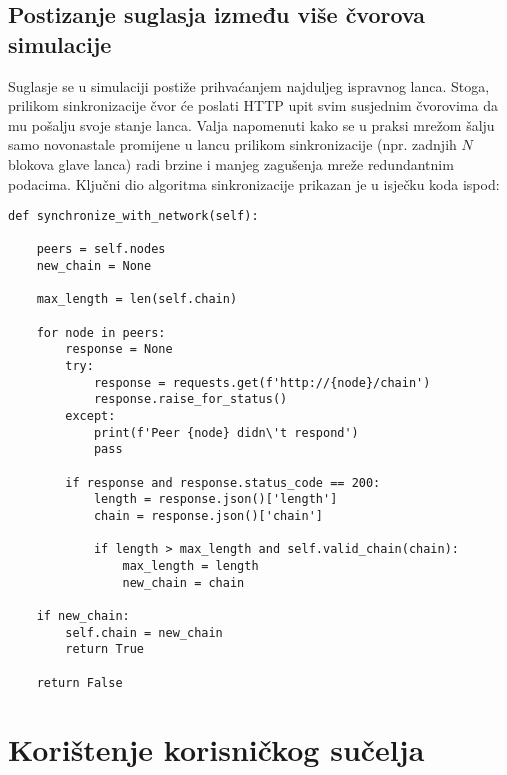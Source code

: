 \documentclass[utf8, zavrsni]{fer}
\begin{document}
\section{Postizanje suglasja između više čvorova simulacije}
Suglasje se u simulaciji postiže prihvaćanjem najduljeg ispravnog lanca. Stoga, prilikom sinkronizacije čvor će poslati HTTP upit svim susjednim čvorovima da mu pošalju svoje stanje lanca. Valja napomenuti kako se u praksi mrežom šalju samo novonastale promijene u lancu prilikom sinkronizacije (npr. zadnjih $ N $ blokova glave lanca) radi brzine i manjeg zagušenja mreže redundantnim podacima. Ključni dio algoritma sinkronizacije prikazan je u isječku koda ispod:

\begin{verbatim}
def synchronize_with_network(self):

    peers = self.nodes
    new_chain = None

    max_length = len(self.chain)

    for node in peers:
        response = None
        try:
            response = requests.get(f'http://{node}/chain')
            response.raise_for_status()
        except:
            print(f'Peer {node} didn\'t respond')
            pass

        if response and response.status_code == 200:
            length = response.json()['length']
            chain = response.json()['chain']

            if length > max_length and self.valid_chain(chain):
                max_length = length
                new_chain = chain

    if new_chain:
        self.chain = new_chain
        return True

    return False
\end{verbatim}

\chapter{Korištenje korisničkog sučelja}


\end{document}
